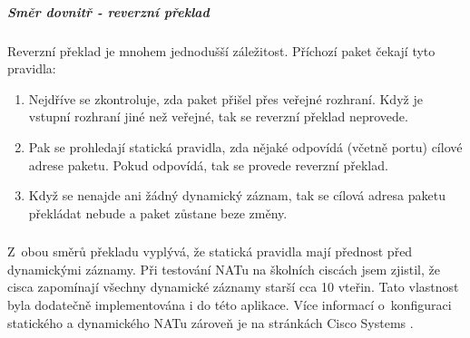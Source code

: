 


\subparagraph{Směr dovnitř - reverzní překlad}

Reverzní překlad je mnohem jednodušší záležitost. Příchozí paket čekají tyto pravidla:
\begin{enumerate}
  \item Nejdříve se zkontroluje, zda paket přišel přes veřejné rozhraní. Když je vstupní rozhraní jiné než veřejné, tak se reverzní překlad neprovede.

  \item Pak se prohledají statická pravidla, zda nějaké odpovídá (včetně portu) cílové adrese paketu. Pokud odpovídá, tak se provede reverzní překlad.

  \item Když se nenajde ani žádný dynamický záznam, tak se cílová adresa paketu překládat nebude a paket zůstane beze změny.
\end{enumerate}


\subsubsection*{}
Z~obou směrů překladu vyplývá, že statická pravidla mají přednost před dynamickými záznamy. Při testování NATu na školních ciscách jsem zjistil, že cisca zapomínají všechny dynamické záznamy starší cca 10 vteřin. Tato vlastnost byla dodatečně implementována i do této aplikace. Více informací o~konfiguraci statického a dynamického NATu zároveň je na stránkách Cisco Systems \cite{cisco:snat_dnat}.









